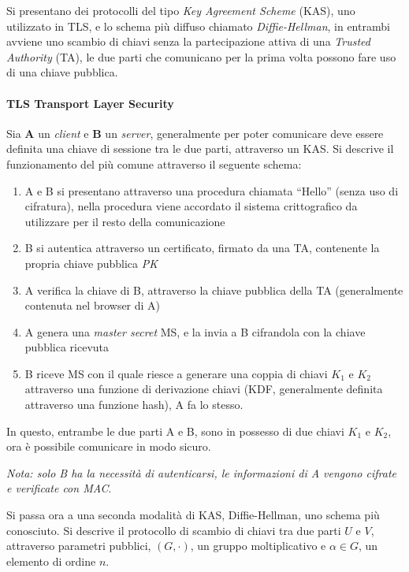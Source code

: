Si presentano dei protocolli del tipo \textit{Key Agreement Scheme} (KAS), uno utilizzato in TLS, e lo schema più diffuso chiamato \textit{Diffie-Hellman}, in entrambi avviene uno scambio di chiavi senza la partecipazione attiva di una \textit{Trusted Authority} (TA), le due parti che comunicano per la prima volta possono fare uso di una chiave pubblica.

\paragraph{TLS Transport Layer Security} Sia \textbf{A} un \textit{client} e \textbf{B} un \textit{server}, generalmente per poter comunicare deve essere definita una chiave di sessione tra le due parti, attraverso un KAS. Si descrive il funzionamento del più comune attraverso il seguente schema:
\begin{enumerate}
    \item A e B si presentano attraverso una procedura chiamata ``Hello'' (senza uso di cifratura), nella procedura viene accordato il sistema crittografico da utilizzare per il resto della comunicazione
    \item B si autentica attraverso un certificato, firmato da una TA, contenente la propria chiave pubblica \emph{PK}
    \item A verifica la chiave di B, attraverso la chiave pubblica della TA (generalmente contenuta nel browser di A)
    \item A genera una \emph{master secret} MS, e la invia a B cifrandola con la chiave pubblica ricevuta
    \item B riceve MS con il quale riesce a generare una coppia di chiavi $K_1$ e $K_2$ attraverso una funzione di derivazione chiavi (KDF, generalmente definita attraverso una funzione hash), A fa lo stesso.
\end{enumerate}
In questo, entrambe le due parti A e B, sono in possesso di due chiavi $K_1$ e $K_2$, ora è possibile comunicare in modo sicuro.
\vspace{1em}

\textit{Nota: solo B ha la necessità di autenticarsi, le informazioni di A vengono cifrate e verificate con MAC}.

\vspace{1em}\noindent
Si passa ora a una seconda modalità di KAS, Diffie-Hellman, uno schema più conosciuto. Si descrive il protocollo di scambio di chiavi tra due parti $U$ e $V$, attraverso parametri pubblici, $(G,\cdot)$, un gruppo moltiplicativo e $\alpha \in G$, un elemento di ordine $n$.

